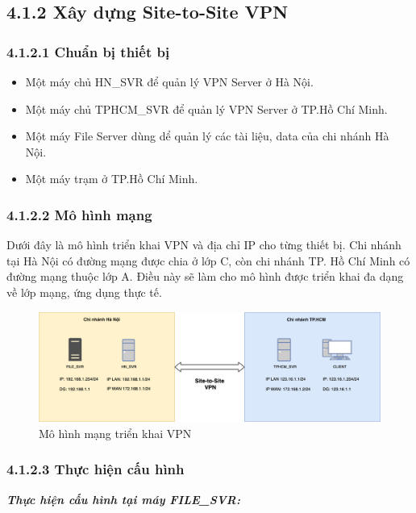  \subsection*{4.1.2 Xây dựng Site-to-Site VPN}

  \subsubsection*{4.1.2.1 Chuẩn bị thiết bị}
 \begin{itemize}
     \item Một máy chủ HN\_SVR để quản lý VPN Server ở Hà Nội.
     \item Một máy chủ TPHCM\_SVR để quản lý  VPN Server ở TP.Hồ Chí Minh.
     \item Một máy File Server dùng dể quản lý các tài liệu, data của chi nhánh Hà Nội.
     \item Một máy trạm ở TP.Hồ Chí Minh.
 \end{itemize}

\subsubsection*{4.1.2.2 Mô hình mạng}

Dưới đây là mô hình triển khai VPN và địa chỉ IP cho từng thiết bị. Chi nhánh tại Hà Nội có đường mạng được chia ở lớp C, còn chi nhánh TP. Hồ Chí Minh có đường mạng thuộc lớp A. Điều này sẽ làm cho mô hình được triển khai đa dạng về lớp mạng, ứng dụng thực tế.

\begin{figure}[htbp]
    \centering
    \includegraphics[width=0.9\linewidth]{img/site-to-site.png}
    \caption{Mô hình mạng triển khai VPN}
\end{figure}
\newpage
\subsubsection*{4.1.2.3 Thực hiện cấu hình}
 \textbf{\textit{Thực hiện cấu hình tại máy FILE\_SVR:}}

